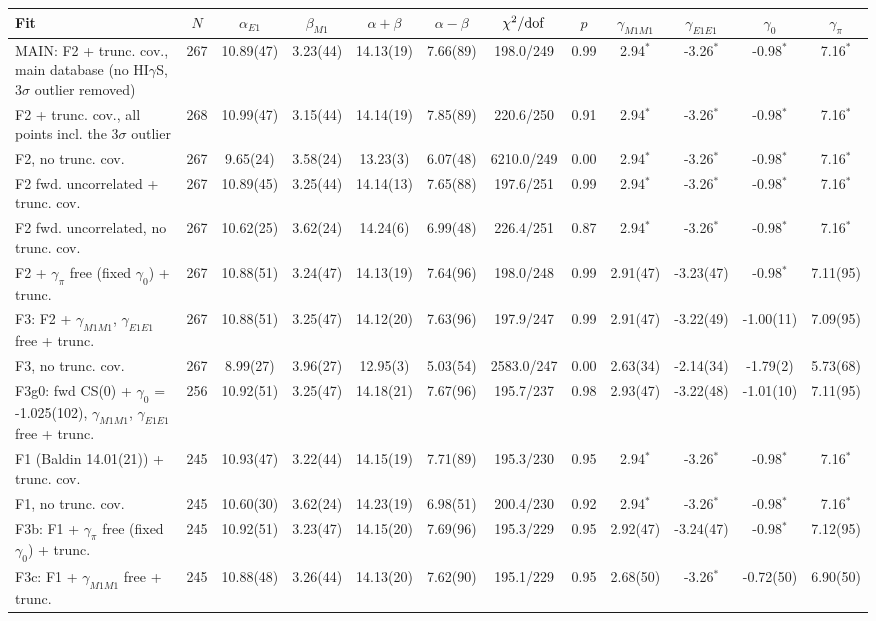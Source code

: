 
\begin{tabular}{lccccccccccc}
\hline
Fit & $N$ & $\alpha_{E1}$ & $\beta_{M1}$ & $\alpha+\beta$ & $\alpha-\beta$ & $\chi^2/{\rm dof}$ & $p$ & $\gamma_{M1M1}$ & $\gamma_{E1E1}$ & $\gamma_0$ & $\gamma_\pi$ \\
\hline
MAIN: F2 + trunc. cov., main database (no HI$\gamma$S, 3$\sigma$ outlier removed) & 267 & 10.89(47) & 3.23(44) & 14.13(19) & 7.66(89) & 198.0/249 & 0.99 & 2.94$^*$ & -3.26$^*$ & -0.98$^*$ & 7.16$^*$ \\
F2 + trunc. cov., all points incl. the 3$\sigma$ outlier & 268 & 10.99(47) & 3.15(44) & 14.14(19) & 7.85(89) & 220.6/250 & 0.91 & 2.94$^*$ & -3.26$^*$ & -0.98$^*$ & 7.16$^*$ \\
F2, no trunc. cov. & 267 & 9.65(24) & 3.58(24) & 13.23(3) & 6.07(48) & 6210.0/249 & 0.00 & 2.94$^*$ & -3.26$^*$ & -0.98$^*$ & 7.16$^*$ \\
F2 fwd. uncorrelated + trunc. cov. & 267 & 10.89(45) & 3.25(44) & 14.14(13) & 7.65(88) & 197.6/251 & 0.99 & 2.94$^*$ & -3.26$^*$ & -0.98$^*$ & 7.16$^*$ \\
F2 fwd. uncorrelated, no trunc. cov. & 267 & 10.62(25) & 3.62(24) & 14.24(6) & 6.99(48) & 226.4/251 & 0.87 & 2.94$^*$ & -3.26$^*$ & -0.98$^*$ & 7.16$^*$ \\
F2 + $\gamma_\pi$ free (fixed $\gamma_0$) + trunc. & 267 & 10.88(51) & 3.24(47) & 14.13(19) & 7.64(96) & 198.0/248 & 0.99 & 2.91(47) & -3.23(47) & -0.98$^*$ & 7.11(95) \\
F3: F2 + $\gamma_{M1M1}$, $\gamma_{E1E1}$ free + trunc. & 267 & 10.88(51) & 3.25(47) & 14.12(20) & 7.63(96) & 197.9/247 & 0.99 & 2.91(47) & -3.22(49) & -1.00(11) & 7.09(95) \\
F3, no trunc. cov. & 267 & 8.99(27) & 3.96(27) & 12.95(3) & 5.03(54) & 2583.0/247 & 0.00 & 2.63(34) & -2.14(34) & -1.79(2) & 5.73(68) \\
F3g0: fwd CS(0) + $\gamma_0$ = -1.025(102), $\gamma_{M1M1}$, $\gamma_{E1E1}$ free + trunc. & 256 & 10.92(51) & 3.25(47) & 14.18(21) & 7.67(96) & 195.7/237 & 0.98 & 2.93(47) & -3.22(48) & -1.01(10) & 7.11(95) \\
F1 (Baldin 14.01(21)) + trunc. cov. & 245 & 10.93(47) & 3.22(44) & 14.15(19) & 7.71(89) & 195.3/230 & 0.95 & 2.94$^*$ & -3.26$^*$ & -0.98$^*$ & 7.16$^*$ \\
F1, no trunc. cov. & 245 & 10.60(30) & 3.62(24) & 14.23(19) & 6.98(51) & 200.4/230 & 0.92 & 2.94$^*$ & -3.26$^*$ & -0.98$^*$ & 7.16$^*$ \\
F3b: F1 + $\gamma_\pi$ free (fixed $\gamma_0$) + trunc. & 245 & 10.92(51) & 3.23(47) & 14.15(20) & 7.69(96) & 195.3/229 & 0.95 & 2.92(47) & -3.24(47) & -0.98$^*$ & 7.12(95) \\
F3c: F1 + $\gamma_{M1M1}$ free + trunc. & 245 & 10.88(48) & 3.26(44) & 14.13(20) & 7.62(90) & 195.1/229 & 0.95 & 2.68(50) & -3.26$^*$ & -0.72(50) & 6.90(50) \\
\hline
\end{tabular}

